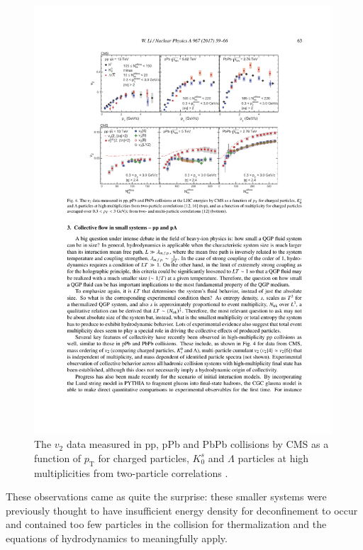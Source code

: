 \begin{figure}[htpb]
  \centering
  \includegraphics[width=0.99\textwidth]{Introduction/small_systems_flow.pdf}
  \caption{The $v_2$ data measured in pp, pPb and PbPb collisions by CMS as a function of $p_\mathrm{T}$ for charged particles, $K_0^s$ and $\Lambda$ particles at high multiplicities from two-particle correlations \cite{Khachatryan2017,Khachatryan2015}.}
  \label{fig:small_systems_v2}
\end{figure}

These observations came as quite the surprise: these smaller systems were previously thought to have insufficient energy density for deconfinement to occur and contained too few particles in the collision for thermalization and the equations of hydrodynamics to meaningfully apply.


